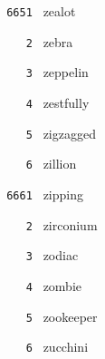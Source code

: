 \documentclass[11pt]{article}
\begin{document}
\begin{multicols}{6}
\vspace{3mm}
\noindent \texttt{ 6651 } zealot  \par
\noindent \texttt{ \ \ \ 2 } zebra  \par
\noindent \texttt{ \ \ \ 3 } zeppelin  \par
\noindent \texttt{ \ \ \ 4 } zestfully  \par
\noindent \texttt{ \ \ \ 5 } zigzagged  \par
\noindent \texttt{ \ \ \ 6 } zillion  \par
\vspace{3mm}
\noindent \texttt{ 6661 } zipping  \par
\noindent \texttt{ \ \ \ 2 } zirconium  \par
\noindent \texttt{ \ \ \ 3 } zodiac  \par
\noindent \texttt{ \ \ \ 4 } zombie  \par
\noindent \texttt{ \ \ \ 5 } zookeeper  \par
\noindent \texttt{ \ \ \ 6 } zucchini
\end{multicols}
\end{document}
